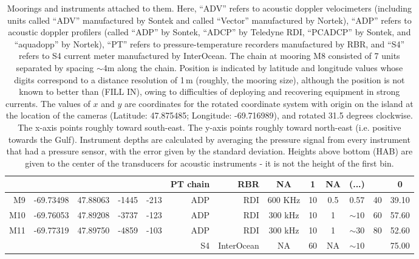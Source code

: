 \documentclass[letterpaper,10pt,landscape]{article}
\begin{document}
\begin{table}
\begin{tabular}{|r|c|c|r|r|r|r|c|c|c|c|c|c|}
    ~                   &                            &                           &                        &                       & PT chain     & RBR        & NA        & 1         & NA       & (...)      &                    &        0          \\\hline
    M9                  & -69.73498                  & 47.88063                  & -1445                  & -213                  & ADP          & RDI        & 600 KHz   & 10        & 0.5      & 0.57       & 40                 &    39.10          \\\hline
    M10                 & -69.76053                  & 47.89208                  & -3737                  & -123                  & ADP          & RDI        & 300 kHz   & 10        & 1        & $\sim10$   & 60                 &    57.60          \\\hline
    \multirow{2}{*}{M11}& \multirow{2}{*}{-69.77319} & \multirow{2}{*}{47.89750} & \multirow{2}{*}{-4859} & \multirow{2}{*}{-103} & ADP          & RDI        & 300 kHz   & 10        & 1        & $\sim30$   & \multirow{2}{*}{80}&    52.60          \\
    ~                   &                            &                           &                        &                       & S4           & InterOcean & NA        & 60        & NA       & $\sim10$   &                    &    75.00          \\\hline
  \end{tabular}
  
  \caption{Moorings and instruments attached to them.  Here, ``ADV''
    refers to acoustic doppler velocimeters (including units called
    ``ADV'' manufactured by Sontek and called ``Vector'' manufactured
    by Nortek), ``ADP'' refers to acoustic doppler profilers
    (called ``ADP'' by Sontek, ``ADCP'' by Teledyne RDI, ``PCADCP'' by
    Sontek, and ``aquadopp'' by Nortek), ``PT'' refers to
    pressure-temperature recorders manufactured by RBR, and ``S4''
    refers to S4 current meter manufactured by InterOcean.  The chain at
    mooring M8 consisted of 7 units separated by spacing $\sim$4m along
    the chain.  Position is indicated by latitude and longitude values
    whose digits correspond to a distance resolution of 1\,m (roughly,
    the mooring size), although the position is not known to better
    than (FILL IN), owing to difficulties of deploying and recovering
    equipment in strong currents.  The values of $x$ and $y$ are
    coordinates for the rotated coordinate system with origin on
    the island at the location of the cameras (Latitude: 47.875485;
    Longitude: -69.716989), and rotated 31.5 degrees clockwise. The
    x-axis points roughly toward south-east. The y-axis points roughly
    toward north-east (i.e. positive towards the Gulf). Instrument
    depths are calculated by averaging the pressure signal from every
    instrument that had a pressure sensor, with the error given by the
    standard deviation. Heights above bottom (HAB) are given to the
    center of the transducers for acoustic instruments - it is not the
    height of the first bin.}
  \end{table}
\end{document}
